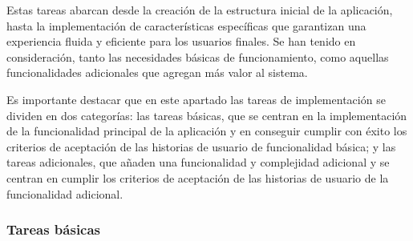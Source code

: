 \documentclass[11pt]{article}
\begin{document}
Estas tareas abarcan desde la creación de la estructura inicial de la aplicación, hasta la implementación de características específicas que 
garantizan una experiencia fluida y eficiente para los usuarios finales. Se han tenido en consideración, tanto las necesidades básicas de funcionamiento, como aquellas funcionalidades
adicionales que agregan más valor al sistema.

Es importante destacar que en este apartado las tareas de implementación se dividen en dos categorías: las tareas básicas, que se centran en la implementación de la funcionalidad
principal de la aplicación y en conseguir cumplir con éxito los criterios de aceptación de las historias de usuario de funcionalidad básica; y las tareas adicionales, que 
añaden una funcionalidad y complejidad adicional y se centran en cumplir los criterios de aceptación de las historias de usuario de la funcionalidad adicional.

\subsubsection{Tareas básicas}
\end{document}
